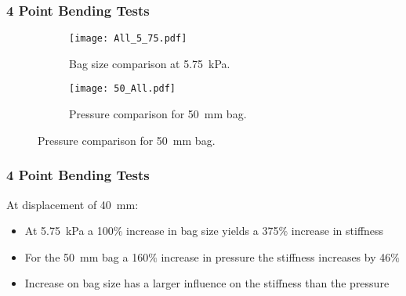 \documentclass[serif, pdf]{beamer}
\begin{document}

\begin{frame}
\frametitle{4 Point Bending Tests}

\begin{figure}[h!]
\begin{subfigure}{.45\textwidth}
  \centering
  \texttt{[image: All\_5\_75.pdf]}
  \caption{\scriptsize{Bag size comparison at 5.75~kPa.}}
  \label{fig:Point_Cloud_75_4-Point_yz}
\end{subfigure}
\begin{subfigure}{.46\textwidth}
  \centering
  \texttt{[image: 50\_All.pdf]}
  \caption{\scriptsize{Pressure comparison for 50~mm bag.}}
  \label{fig:Point_Cloud_75_4-Point_xz}
\end{subfigure}%
\label{fig:Point_Cloud_75_Load}
\end{figure}
\end{frame}




\begin{frame}
\frametitle{4 Point Bending Tests}
At displacement of 40~mm:
\begin{itemize}
\item<1-> At 5.75~kPa a 100$\%$ increase in bag size yields a 375$\%$ increase in stiffness
\item<2-> For the 50~mm bag a 160$\%$ increase in pressure the stiffness increases by 46$\%$
\item<3-> Increase on bag size has a larger influence on the stiffness than the pressure
\end{itemize}
\end{frame}


\end{document}
